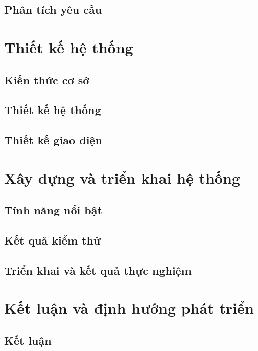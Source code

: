 \documentclass{report}
\begin{document}
\section{Phân tích yêu cầu}


\chapter{Thiết kế hệ thống}

\section{Kiến thức cơ sở}


\section{Thiết kế hệ thống}


\section{Thiết kế giao diện}


\chapter{Xây dựng và triển khai hệ thống}

\section{Tính năng nổi bật}


\section{Kết quả kiểm thử}


\section{Triển khai và kết quả thực nghiệm}


\chapter{Kết luận và định hướng phát triển}

\section{Kết luận}

\end{document}
